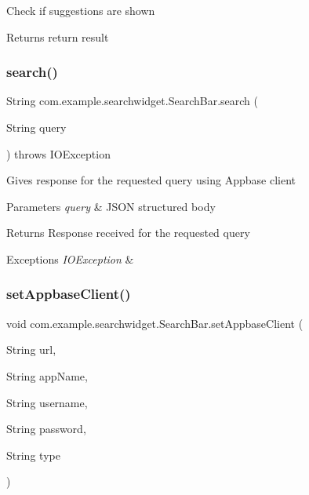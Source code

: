 Check if suggestions are shown

\begin{DoxyReturn}{Returns}
return result 
\end{DoxyReturn}
\mbox{\label{classcom_1_1example_1_1searchwidget_1_1_search_bar_a3ccff2a33e4f3bba007aa04840265b47}} 
\subsubsection{\texorpdfstring{search()}{search()}}
{\footnotesize\ttfamily String com.\+example.\+searchwidget.\+Search\+Bar.\+search (\begin{DoxyParamCaption}\item[{String}]{query }\end{DoxyParamCaption}) throws I\+O\+Exception}

Gives response for the requested query using Appbase client 
\begin{DoxyParams}{Parameters}
{\em query} & J\+S\+ON structured body \\
\hline
\end{DoxyParams}
\begin{DoxyReturn}{Returns}
Response received for the requested query 
\end{DoxyReturn}

\begin{DoxyExceptions}{Exceptions}
{\em I\+O\+Exception} & \\
\hline
\end{DoxyExceptions}
\mbox{\label{classcom_1_1example_1_1searchwidget_1_1_search_bar_aeee8a868bca0435ece56efb35e84602d}} 
\subsubsection{\texorpdfstring{setAppbaseClient()}{setAppbaseClient()}\hspace{0.1cm}{\footnotesize\ttfamily [1/2]}}
{\footnotesize\ttfamily void com.\+example.\+searchwidget.\+Search\+Bar.\+set\+Appbase\+Client (\begin{DoxyParamCaption}\item[{String}]{url,  }\item[{String}]{app\+Name,  }\item[{String}]{username,  }\item[{String}]{password,  }\item[{String}]{type }\end{DoxyParamCaption})}

